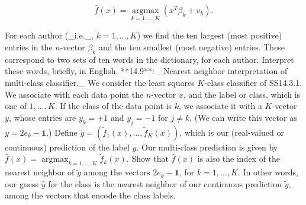 \[\hat{f}(x)=\operatorname*{argmax}_{k=1,\ldots,K}(x^{T}\beta_{k}+v_{k}).\]

For each author (_i.e._, \(k=1,\ldots,K\)) we find the ten largest (most positive) entries in the \(n\)-vector \(\beta_{k}\) and the ten smallest (most negative) entries. These correspond to two sets of ten words in the dictionary, for each author. Interpret these words, briefly, in English.
**14.9**: _Nearest neighbor interpretation of multi-class classifier._ We consider the least squares \(K\)-class classifier of SS14.3.1. We associate with each data point the \(n\)-vector \(x\), and the label or class, which is one of \(1,\ldots,K\). If the class of the data point is \(k\), we associate it with a \(K\)-vector \(y\), whose entries are \(y_{k}=+1\) and \(y_{j}=-1\) for \(j\neq k\). (We can write this vector as \(y=2e_{k}-\mathbf{1}\).) Define \(\tilde{y}=(\tilde{f}_{1}(x),\ldots,\tilde{f}_{K}(x))\), which is our (real-valued or continuous) prediction of the label \(y\). Our multi-class prediction is given by \(\hat{f}(x)=\operatorname*{argmax}_{k=1,\ldots,K}\tilde{f}_{k}(x)\). Show that \(\hat{f}(x)\) is also the index of the nearest neighbor of \(\tilde{y}\) among the vectors \(2e_{k}-\mathbf{1}\), for \(k=1,\ldots,K\). In other words, our guess \(\hat{y}\) for the class is the nearest neighbor of our continuous prediction \(\tilde{y}\), among the vectors that encode the class labels.

